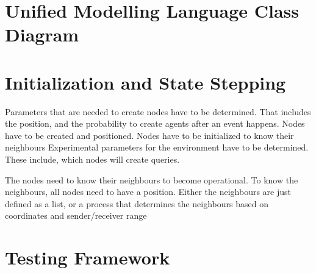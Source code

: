\documentclass[a4paper,11pt,twoside]{article}
\begin{document}
\section{Unified Modelling Language Class Diagram}



\section{Initialization and State Stepping}
Parameters that are needed to create nodes have to be determined.
That includes the position, and the probability to create agents after
an event happens. 
Nodes have to be created and positioned. 
Nodes have to be initialized to know their neighbours
Experimental parameters for the environment have to be determined.
These include, which nodes will create queries. 


The nodes need to know their neighbours to become operational. To know
the neighbours, all nodes need to have a position. Either the
neighbours are just defined as a list, or a process that determines
the neighbours based on coordinates and sender/receiver range

\section{Testing Framework}



\end{document}
